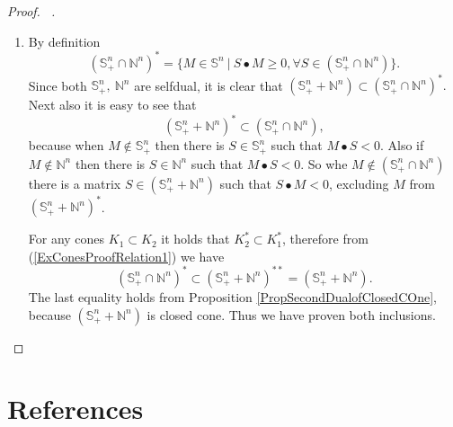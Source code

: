 \documentclass[12pt]{book}
\theoremstyle{definition}
\begin{document}
\begin{appendix}
\begin{proof}[Proof. \ ]
\begin{enumerate}
To prove the other inclusion $(\mathbb{P}^n)^* \subseteq \mathbb{C}^n$, take any $M\notin \mathbb{C}^n$. We will show that $M$ is neither in $(\mathbb{P}^n)^*$. For such $M$, there is a $x\in\mathbb{R}^n_+$, such that $x^TMx<0$. Indeed, the $xx^T \in \mathbb{P}^n$ then excludes $M$ from $(\mathbb{P}^n)^*$ since $M\bullet xx^T = x^TMx<0.$

We have proven that $(\mathbb{P}^n)^* = \mathbb{C}^n$. Since $\mathbb{P}^n$ is a closed convex cone, it holds that $\mathbb{P}^n = (\mathbb{P}^n)^{**} = ((\mathbb{P}^n)^{*})^* = (\mathbb{C}^n)^*$, and the proof is complete.

\item By definition 
$$(\mathbb{S}^n_+\cap \mathbb{N}^n)^* = \{ M\in\mathbb{S}^n \ \vert \ S\bullet M\geq 0, \forall S\in (\mathbb{S}^n_+\cap \mathbb{N}^n)\}. $$
Since both $\mathbb{S}^n_+,\ \mathbb{N}^n$ are selfdual, it is clear that $(\mathbb{S}^n_+ +\mathbb{N}^n) \subset (\mathbb{S}^n_+\cap \mathbb{N}^n)^*.$ Next also it is easy to see that 
\begin{equation}
\label{ExConesProofRelation1}
(\mathbb{S}^n_+ +\mathbb{N}^n)^* \subset (\mathbb{S}^n_+\cap \mathbb{N}^n),
\end{equation}
because 
when $M\notin \mathbb{S}^n_+$  then there is $S\in\mathbb{S}^n_+$ such that $M\bullet S < 0$. Also if $M\notin \mathbb{N}^n$ then there is $S\in\mathbb{N}^n$ such that $M\bullet S < 0$. So whe $M\notin (\mathbb{S}^n_+\cap \mathbb{N}^n)$ there is a matrix $S\in (\mathbb{S}^n_+ + \mathbb{N}^n)$ such that $S\bullet M <0$, excluding $M$ from $(\mathbb{S}^n_+ +\mathbb{N}^n)^*$.



For any cones $K_1\subset K_2$ it holds that $K_2^*\subset K_1^*$, therefore from (\ref{ExConesProofRelation1}) we have $$(\mathbb{S}^n_+ \cap \mathbb{N}^n)^* \subset (\mathbb{S}^n_+ + \mathbb{N}^n)^{**} = (\mathbb{S}^n_+ + \mathbb{N}^n).$$
The last equality holds from Proposition \ref{PropSecondDualofClosedCOne}, because $(\mathbb{S}^n_+ + \mathbb{N}^n)$ is closed cone. Thus we have proven both inclusions.
\end{enumerate}
\end{proof}
\end{appendix}

\chapter*{References}
\end{document}
